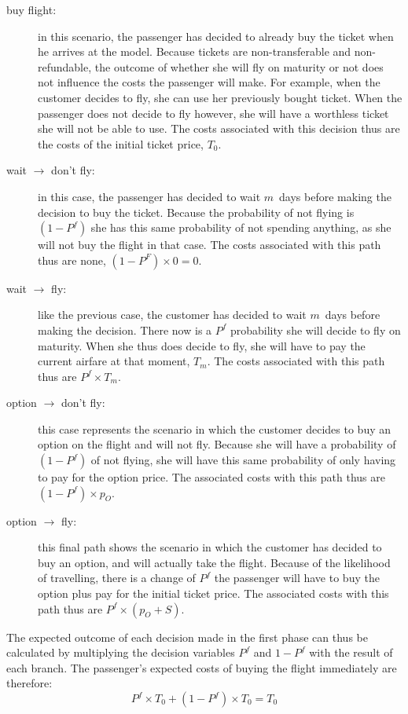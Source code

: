 \begin{description}
\item[buy flight:] in this scenario, the passenger has decided to already buy the ticket when he arrives at the model. Because tickets are non-transferable and non-refundable, the outcome of whether she will fly on maturity or not does not influence the costs the passenger will make. For example, when the customer decides to fly, she can use her previously bought ticket. When the passenger does not decide to fly however, she will have a worthless ticket she will not be able to use. The costs associated with this decision thus are the costs of the initial ticket price, $T_0$.

\item[wait $\rightarrow$ don't fly:] in this case, the passenger has decided to wait $m$~days before making the decision to buy the ticket. Because the probability of not flying is $(1 - P^f)$ she has this same probability of not spending anything, as she will not buy the flight in that case. The costs associated with this path thus are none, $(1 - P^F) \times 0 = 0$.

\item[wait $\rightarrow$ fly:] like the previous case, the customer has decided to wait $m$~days before making the decision. There now is a $P^f$ probability she will decide to fly on maturity. When she thus does decide to fly, she will have to pay the current airfare at that moment, $T_m$. The costs associated with this path thus are $P^f \times T_m$.

\item[option $\rightarrow$ don't fly:] this case represents the scenario in which the customer decides to buy an option on the flight and will not fly. Because she will have a probability of $(1 - P^f)$ of not flying, she will have this same probability of only having to pay for the option price. The associated costs with this path thus are $(1 - P^f) \times p_O$.

\item[option $\rightarrow$ fly:] this final path shows the scenario in which the customer has decided to buy an option, and will actually take the flight. Because of the likelihood of travelling, there is a change of $P^f$ the passenger will have to buy the option plus pay for the initial ticket price. The associated costs with this path thus are $P^f \times (p_O + S)$.
\end{description}


The expected outcome of each decision made in the first phase can thus be calculated by multiplying the decision variables $P^f$ and $1 - P^f$ with the result of each branch. The passenger's expected costs of buying the flight immediately are therefore:
\begin{equation*}
P^f \times T_0 + (1 - P^f) \times T_0 = T_0
\end{equation*}

